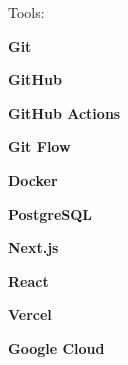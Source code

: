 \documentclass[9pt]{developercv} %
\begin{document}
\medskip

Tools:
\begin{itemize*}
  \item[] \textbf{Git}
  \item \textbf{GitHub}
  \item \textbf{GitHub Actions}
  \item \textbf{Git Flow}
  \item \textbf{Docker}
  \item \textbf{PostgreSQL}
  \item \textbf{Next.js}
  \item \textbf{React}
  \item \textbf{Vercel}
  \item \textbf{Google Cloud}
\end{itemize*}

\bigskip

\end{document}
